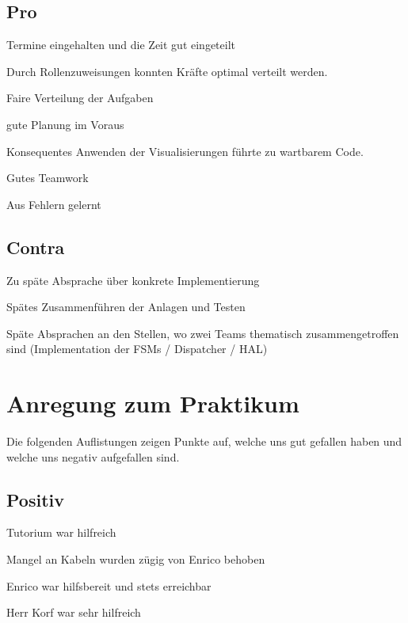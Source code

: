 \documentclass[a4paper, 11pt]{article}
\begin{document}
\subsection{Pro}
\begin{compactenum}[$\bullet$]
\item Termine eingehalten und die Zeit gut eingeteilt
\medskip
\item Durch Rollenzuweisungen konnten Kräfte optimal verteilt werden.
\medskip
\item Faire Verteilung der Aufgaben
\medskip
\item gute Planung im Voraus
\medskip
\item Konsequentes Anwenden der Visualisierungen führte zu wartbarem Code. 
\medskip
\item Gutes Teamwork
\medskip
\item Aus Fehlern gelernt
\end{compactenum}

\subsection{Contra}
\begin{compactenum}[$\bullet$]
\item Zu späte Absprache über konkrete Implementierung
\medskip
\item Spätes Zusammenführen der Anlagen und Testen
\medskip
\item Späte Absprachen an den Stellen, wo zwei Teams thematisch zusammengetroffen sind (Implementation der FSMs / Dispatcher / HAL)
\end{compactenum}

\section{Anregung zum Praktikum}
Die folgenden Auflistungen zeigen Punkte auf, welche uns gut gefallen haben und welche uns negativ aufgefallen sind.

\subsection{Positiv}
\begin{compactenum}[$\bullet$]
\item Tutorium war hilfreich
\medskip
\item Mangel an Kabeln wurden zügig von Enrico behoben
\medskip
\item Enrico war hilfsbereit und stets erreichbar
\medskip
\item Herr Korf war sehr hilfreich
\end{compactenum}
\end{document}
